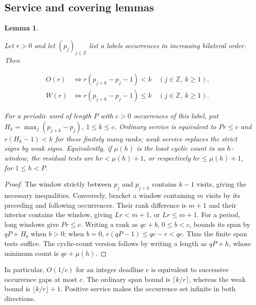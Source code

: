 \documentclass[11pt,a4paper]{article}
\newtheorem{lemma}[theorem]{Lemma}
\begin{document}
\subsection{Service and covering lemmas}\label{sec:A.1}

\begin{lemma}\label{stmt:A.1}

 Let \(r>0\) and let \((p_j)_{j\in\mathbb Z}\) list a label\textquotesingle s occurrences in increasing bilateral order. Then

\begin{equation}
\begin{aligned}
 O(r)&\Longleftrightarrow
 r(p_{j+k}-p_j-1)<k\quad(j\in\mathbb Z,\ k\ge1),\\
 W(r)&\Longleftrightarrow
 r(p_{j+k}-p_j-1)\le k\quad(j\in\mathbb Z,\ k\ge1).
\end{aligned}
\tag{A.1}\label{eq:A.1}
\end{equation}

For a periodic word of length \(P\) with \(c>0\) occurrences of this label, put \(H_k=\max_j(p_{j+k}-p_j)\), \(1\le k\le c\). Ordinary service is equivalent to \(Pr\le c\) and \(r(H_k-1)<k\) for these finitely many ranks; weak service replaces the strict signs by weak signs. Equivalently, if \(\mu(h)\) is the least cyclic count in an \(h\)-window, the residual tests are \(hr<\mu(h)+1\), or respectively \(hr\le\mu(h)+1\), for \(1\le h<P\).

\end{lemma}

\begin{proof}

 The window strictly between \(p_j\) and \(p_{j+k}\) contains \(k-1\) visits, giving the necessary inequalities. Conversely, bracket a window containing \(m\) visits by its preceding and following occurrences. Their rank difference is \(m+1\) and their interior contains the window, giving \(Lr<m+1\), or \(Lr\le m+1\). For a period, long windows give \(Pr\le c\). Writing a rank as \(qc+b\), \(0\le b<c\), bounds its span by \(qP+H_b\) when \(b>0\); when \(b=0\), \(r(qP-1)\le qc-r<qc\). Thus the finite span tests suffice. The cyclic-count version follows by writing a length as \(qP+h\), whose minimum count is \(qc+\mu(h)\). 

\end{proof}

In particular, \(O(1/c)\) for an integer deadline \(c\) is equivalent to successive occurrence gaps at most \(c\). The ordinary span bound is \(\lceil k/r\rceil\), whereas the weak bound is \(\lfloor k/r\rfloor+1\). Positive service makes the occurrence set infinite in both directions.
\end{document}
